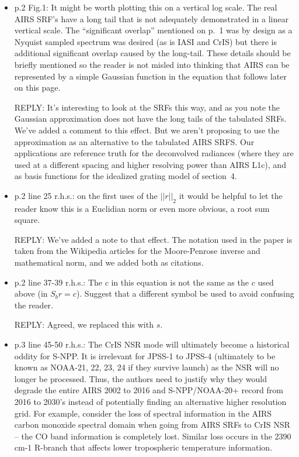 \documentclass[11pt]{article}
\newcommand {\reply} {\mbox{\small REPLY}}
\begin{document}
\begin{itemize}
\item p.2 Fig.1: It might be worth plotting this on a vertical log
  scale. The real AIRS SRF’s have a long tail that is not adequately
  demonstrated in a linear vertical scale. The “significant overlap”
  mentioned on p.~1 was by design as a Nyquist sampled spectrum was
  desired (as is IASI and CrIS) but there is additional significant
  overlap caused by the long-tail. These details should be briefly
  mentioned so the reader is not misled into thinking that AIRS can
  be represented by a simple Gaussian function in the equation that
  follows later on this page.

  \reply: It's interesting to look at the SRFs this way, and as you
  note the Gaussian approximation does not have the long tails of
  the tabulated SRFs.  We've added a comment to this effect.  But we
  aren't proposing to use the approximation as an alternative to the
  tabulated AIRS SRFS.  Our applications are reference truth for the
  deconvolved radiances (where they are used at a different spacing
  and higher resolving power than AIRS L1c), and as basis functions
  for the idealized grating model of section~4.

\item p.2 line 25 r.h.s.: on the first uses of the $||r||_2$ it
  would be helpful to let the reader know this is a Euclidian norm
  or even more obvious, a root sum square.

  \reply: We've added a note to that effect.  The notation used in
  the paper is taken from the Wikipedia articles for the
  Moore-Penrose inverse and mathematical norm, and we added both as
  citations.

\item p.2 line 37-39 r.h.s.: The $c$ in this equation is not the
  same as the $c$ used above (in $S_b r = c$). Suggest that a
  different symbol be used to avoid confusing the reader.

  \reply: Agreed, we replaced this with $s$.

\item p.3 line 45-50 r.h.s.: The CrIS NSR mode will ultimately
  become a historical oddity for S-NPP. It is irrelevant for JPSS-1
  to JPSS-4 (ultimately to be known as NOAA-21, 22, 23, 24 if they
  survive launch) as the NSR will no longer be processed. Thus, the
  authors need to justify why they would degrade the entire AIRS
  2002 to 2016 and S-NPP/NOAA-20+ record from 2016 to 2030’s instead
  of potentially finding an alternative higher resolution grid. For
  example, consider the loss of spectral information in the AIRS
  carbon monoxide spectral domain when going from AIRS SRFs to CrIS
  NSR – the CO band information is completely lost. Similar loss
  occurs in the 2390 cm-1 R-branch that affects lower tropospheric
  temperature information.


\end{itemize}
\end{document}
